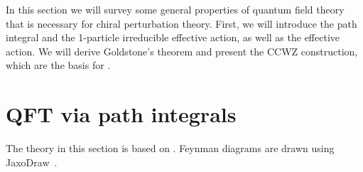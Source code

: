 In this section we will survey some general properties of quantum field theory that is necessary for chiral perturbation theory.
First, we will introduce the path integral and the 1-particle irreducible effective action, as well as the effective action.
We will derive Goldstone's theorem and present the CCWZ construction, which are the basis for \chpt.

\section{QFT via path integrals}
\label{section:path integral}

The theory in this section is based on \cite{Peskin:IntroQFT,weinberg_1995,weinberg_1996_vol2,Schwartz:QFT}.
Feynman diagrams are drawn using JaxoDraw~\cite{JaxoDraw}.

